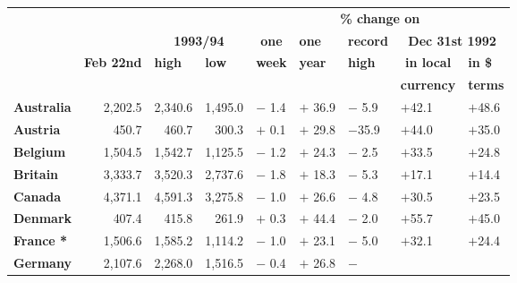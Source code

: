 \documentclass{article}
\begin{document}
\begin{center}
\begin{tabular}{llllcllcl}
&  &  &  & \multicolumn{5}{c}{\textbf{\% change on}} \\ \cline{5-9}
&  & \multicolumn{2}{c}{\textbf{1993/94}} & \textbf{one} & \textbf{one} & 
\textbf{record} & \multicolumn{2}{c}{\textbf{Dec 31st 1992}} \\ \cline{3-4}
& \textbf{Feb 22nd} & \textbf{high} & \textbf{low} & \textbf{week} & \textbf{%
year} & \textbf{high} & \textbf{in local} & \textbf{in \$} \\ 
&  &  &  & \multicolumn{1}{l}{} &  &  & \textbf{currency} & \textbf{terms}
\\ \hline
\textbf{Australia} & \multicolumn{1}{r}{2,202.5} & \multicolumn{1}{r}{2,340.6
} & \multicolumn{1}{r}{1,495.0} & \multicolumn{1}{l}{$-$ 1.4} & $+$ 36.9 & $%
- $ 5.9 & \multicolumn{1}{l}{$+$42.1} & $+$48.6 \\ \hline
\textbf{Austria} & \multicolumn{1}{r}{450.7} & \multicolumn{1}{r}{460.7} & 
\multicolumn{1}{r}{300.3} & \multicolumn{1}{l}{$+$ 0.1} & $+$ 29.8 & $-$35.9
& \multicolumn{1}{l}{$+$44.0} & $+$35.0 \\ \hline
\textbf{Belgium} & \multicolumn{1}{r}{1,504.5} & \multicolumn{1}{r}{1,542.7}
& \multicolumn{1}{r}{1,125.5} & \multicolumn{1}{l}{$-$ 1.2} & $+$ 24.3 & $-$
2.5 & \multicolumn{1}{l}{$+$33.5} & $+$24.8 \\ \hline
\textbf{Britain} & \multicolumn{1}{r}{3,333.7} & \multicolumn{1}{r}{3,520.3}
& \multicolumn{1}{r}{2,737.6} & \multicolumn{1}{l}{$-$ 1.8} & $+$ 18.3 & $-$
5.3 & \multicolumn{1}{l}{$+$17.1} & $+$14.4 \\ \hline
\textbf{Canada} & \multicolumn{1}{r}{4,371.1} & \multicolumn{1}{r}{4,591.3}
& \multicolumn{1}{r}{3,275.8} & \multicolumn{1}{l}{$-$ 1.0} & $+$ 26.6 & $-$
4.8 & \multicolumn{1}{l}{$+$30.5} & $+$23.5 \\ \hline
\textbf{Denmark} & \multicolumn{1}{r}{407.4} & \multicolumn{1}{r}{415.8} & 
\multicolumn{1}{r}{261.9} & \multicolumn{1}{l}{$+$ 0.3} & $+$ 44.4 & $-$ 2.0
& \multicolumn{1}{l}{$+$55.7} & $+$45.0 \\ \hline
\textbf{France *} & \multicolumn{1}{r}{1,506.6} & \multicolumn{1}{r}{1,585.2}
& \multicolumn{1}{r}{1,114.2} & \multicolumn{1}{l}{$-$ 1.0} & $+$ 23.1 & $-$
5.0 & \multicolumn{1}{l}{$+$32.1} & $+$24.4 \\ \hline
\textbf{Germany} & \multicolumn{1}{r}{2,107.6} & \multicolumn{1}{r}{2,268.0}
& \multicolumn{1}{r}{1,516.5} & \multicolumn{1}{l}{$-$ 0.4} & $+$ 26.8 & $-$

\end{tabular}
\end{center}
\end{document}
